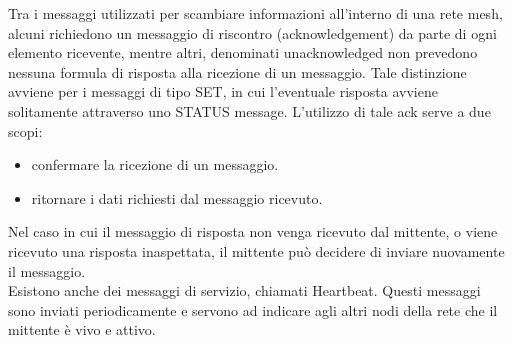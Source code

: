 \noindent Tra i messaggi utilizzati per scambiare informazioni all'interno di una rete mesh, alcuni richiedono un messaggio di riscontro (acknowledgement) da parte di ogni elemento ricevente, mentre altri, denominati unacknowledged non prevedono nessuna formula di risposta alla ricezione di un messaggio. Tale distinzione avviene per i messaggi di tipo SET, in cui l'eventuale risposta avviene  solitamente attraverso uno STATUS message. L'utilizzo di tale ack serve a due scopi:
\begin{itemize}
    \item confermare la ricezione di un messaggio.
    \item ritornare i dati richiesti dal messaggio ricevuto.
\end{itemize}

\noindent Nel caso in cui il messaggio di risposta non venga ricevuto dal mittente, o viene ricevuto una risposta inaspettata, il mittente può decidere di inviare nuovamente il messaggio.\\

\noindent Esistono anche dei messaggi di servizio, chiamati Heartbeat. Questi messaggi sono inviati periodicamente e servono ad indicare agli altri nodi della rete che il mittente è vivo e attivo.

